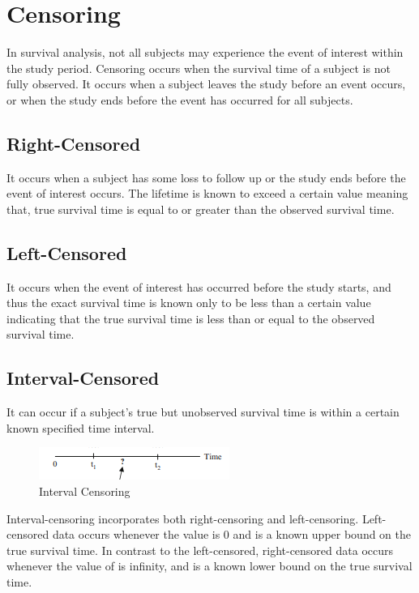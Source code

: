 \documentclass[12pt]{report} %
\begin{document}
\section{Censoring}

In survival analysis, not all subjects may experience the event of interest within the study period. Censoring occurs when the survival time of a subject is not fully observed. It occurs when a subject leaves the study before an event occurs, or when the study ends before the event has occurred for all subjects.


\subsection{Right-Censored}

It occurs when a subject has some loss to follow up or the study ends before the event of interest occurs. The lifetime is known to exceed a certain value meaning that, true survival time is equal to or greater than the observed survival time.

\subsection{Left-Censored}

It occurs when the event of interest has occurred before the study starts, and thus the exact survival time is known only to be less than a certain value indicating that the true survival time is less than or equal to the observed survival time.

\subsection{Interval-Censored}

It can occur if a subject’s true but unobserved survival time is within a certain known specified time interval. 
\begin{figure}
    \centering
    \includegraphics[width=0.5\linewidth]{Figure 3/3.1.png}
    \caption{Interval Censoring}
    \label{Figure 3.1}
\end{figure}

Interval-censoring incorporates both right-censoring and left-censoring. Left-censored data occurs whenever the value is 0 and  is a known upper bound on the true survival time. In contrast to the left-censored, right-censored data occurs whenever the value of  is infinity, and is a known lower bound on the true survival time.
\end{document}

